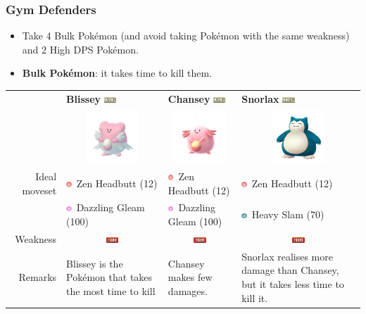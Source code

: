 \documentclass[12pt]{beamer}
\newcommand{\fightingfull}{\includegraphics[height=0.2cm]{../../images/type/full/Fighting.png}}
\newcommand{\normalfull}{\includegraphics[height=0.2cm]{../../images/type/full/Normal.png}}
\newcommand{\psysimp}{\includegraphics[height=0.2cm]{../../images/type/simplified/psy.png}}
\newcommand{\steelsimp}{\includegraphics[height=0.2cm]{../../images/type/simplified/steel.png}}
\newcommand{\fairysimp}{\includegraphics[height=0.2cm]{../../images/type/simplified/fairy.png}}
\begin{document}
\begin{frame}
\frametitle{Gym Defenders}

\begin{block}{}
\begin{footnotesize}

\begin{itemize}
  \item Take 4 Bulk Pok\'emon (and avoid taking Pok\'emon with the same weakness) and 2 High DPS Pok\'emon.
  \item \textbf{Bulk Pok\'emon}: it takes time to kill them. 
 \end{itemize}

\begin{center}
\begin{tabular}{rp{3.2cm}p{3.2cm}p{3.2cm}}
&\textbf{Blissey} \hfill \normalfull& \textbf{Chansey} \hfill \normalfull & \textbf{Snorlax} \hfill \normalfull \\
&\multicolumn{1}{c}{\includegraphics[width=2cm]{../../images/pokemon/Blissey}} & 
\multicolumn{1}{c}{\includegraphics[width=2cm]{../../images/pokemon/Chansey}} &
\multicolumn{1}{c}{\includegraphics[width=2cm]{../../images/pokemon/Snorlax}} \\ \hline
Ideal moveset &\psysimp~Zen Headbutt (12) & \psysimp~Zen Headbutt (12) & \psysimp~Zen Headbutt (12)   \\
&\fairysimp~Dazzling Gleam (100) & \fairysimp~Dazzling Gleam (100) & \steelsimp~Heavy Slam (70)  \\ \hline
Weakness & \multicolumn{1}{c}{\fightingfull} & \multicolumn{1}{c}{\fightingfull} & \multicolumn{1}{c}{\fightingfull}  \\ \hline
Remarks & Blissey is the Pok\'emon that takes the most time to kill & Chansey makes few damages. & Snorlax realises more damage than Chansey, but it takes less time to kill it.   \\
\end{tabular}
\end{center}


\end{footnotesize}
\end{block}
\end{frame}
\end{document}
